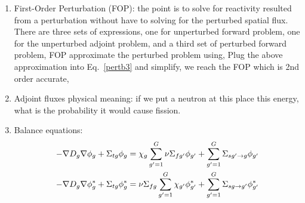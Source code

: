 \documentclass{school-22.211-notes}
\begin{document}
\clearpage
{}
\begin{enumerate}
\item  First-Order Perturbation (FOP): the point is to solve for reactivity resulted from a perturbation without have to solving for the perturbed spatial flux. There are three sets of expressions, one for unperturbed forward problem, one for the unperturbed adjoint problem,
and a third set of perturbed forward problem, 
FOP approximate the perturbed problem using, 
Plug the above approximation into Eq.~\ref{pertb3} and simplify, we reach the FOP which is 2nd order accurate, 

\item Adjoint fluxes physical meaning: if we put a neutron at this place this energy, what is the probability it would cause fission.

  \item Balance equations:
    \begin{align}
      -\nabla D_g  \nabla \phi_g + \Sigma_{tg} \phi_g &= \chi_g \displaystyle\sum_{g'=1}^G \nu \Sigma_{fg'}  \phi_{g'} + \displaystyle\sum_{g'=1}^G \Sigma_{sg'\to g} \phi_{g'} \\
      -\nabla D_g  \nabla \phi_g^* + \Sigma_{tg}  \phi_g^* &= \nu \Sigma_{fg}  \displaystyle\sum_{g'=1}^G  \chi_{g'} \phi_{g'}^*  + \displaystyle\sum_{g'=1}^G \Sigma_{sg\to g'}  \phi_{g'}^*
    \end{align}


\end{enumerate}
\end{document}

